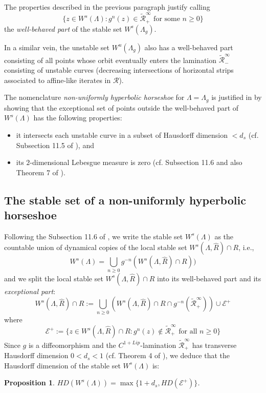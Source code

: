 \documentclass[12pt]{amsart}
\newtheorem{proposition}[theorem]{Proposition}
\numberwithin{equation}{section}
\theoremstyle{definition}
\newcommand{\<}{{\langle}}
\renewcommand{\>}{{\rangle}}
\begin{document}
The properties described in the previous paragraph justify calling 
$$\{z\in W^s(\Lambda): g^n(z)\in\widetilde{\mathcal{R}}^{\infty}_+ \textrm{ for some } n\geq 0\}$$
the \emph{well-behaved part} of the stable set $W^s(\Lambda_g)$. 

In a similar vein, the unstable set $W^u(\Lambda_g)$ also has a well-behaved part consisting of all points whose orbit eventually enters the lamination $\widetilde{\mathcal{R}}^{\infty}_-$ consisting of unstable curves (decreasing intersections of horizontal strips associated to affine-like iterates in $\mathcal{R}$).

The nomenclature \emph{non-uniformly hyperbolic horseshoe} for $\Lambda=\Lambda_g$ is justified in \cite{PY09} by showing that the exceptional set of points outside the well-behaved part of $W^s(\Lambda)$ has the following properties: 
\begin{itemize}
\item it intersects each unstable curve in a subset of Hausdorff dimension $<d_s$ (cf. Subsection 11.5 of \cite{PY09}), and   
\item its $2$-dimensional Lebesgue measure is zero (cf. Subsection 11.6 and also Theorem 7 of \cite{PY09}).
\end{itemize}

\subsection{The stable set of a non-uniformly hyperbolic horseshoe} Following the Subsection 11.6 of \cite{PY09}, we write the stable set $W^s(\Lambda)$ as the countable union of dynamical copies of the local stable set $W^s(\Lambda, \widehat{R})\cap R$, i.e., 
$$W^s(\Lambda)=\bigcup\limits_{n\geq 0} g^{-n}(W^s(\Lambda,\widehat{R})\cap R))$$
and we split the local stable set $W^s(\Lambda,\widehat{R})\cap R$ into its well-behaved part and its \emph{exceptional part}:
$$W^s(\Lambda,\widehat{R})\cap R := \bigcup\limits_{n\geq 0} \left(W^s(\Lambda,\widehat{R})\cap R\cap g^{-n}(\widetilde{\mathcal{R}}^{\infty}_+)\right)\cup\mathcal{E}^+$$
where 
\begin{equation}\label{e.exceptional-set-def}
\mathcal{E}^+:=\{z\in W^s(\Lambda,\widehat{R})\cap R: g^n(z)\notin\widetilde{\mathcal{R}}^{\infty}_+ \textrm{ for all } n\geq 0\}
\end{equation}
Since $g$ is a diffeomorphism and the $C^{1+Lip}$-lamination $\widetilde{\mathcal{R}}^{\infty}_+$ has transverse Hausdorff dimension $0<d_s<1$ (cf. Theorem 4 of \cite{PY09}), we deduce that the Hausdorff dimension of the stable set $W^s(\Lambda)$ is:
\begin{proposition}\label{p.HD-Ws-E+} $HD(W^s(\Lambda))=\max\{1+d_s, HD(\mathcal{E}^+)\}$.
\end{proposition}
\end{document}
